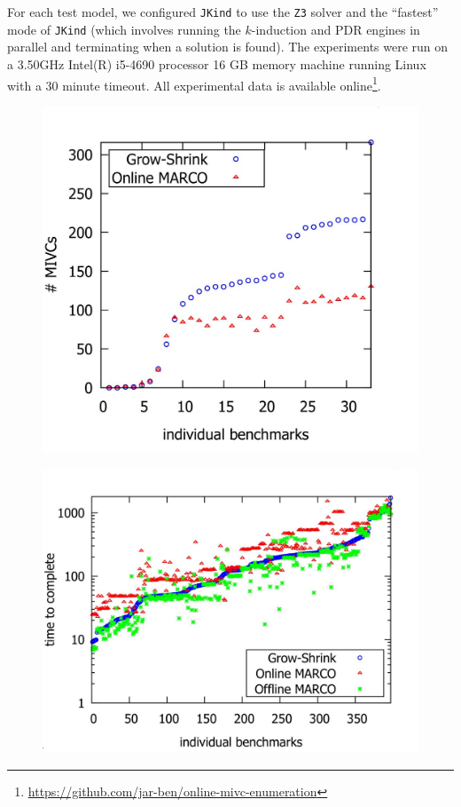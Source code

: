 For each test model, we configured \texttt{JKind} to use the \texttt{Z3} solver and the ``fastest'' mode of \texttt{JKind} (which involves running the $k$-induction and PDR engines in parallel and terminating when a solution is found). The experiments were run on a  3.50GHz  Intel(R) i5-4690 processor 16 GB memory machine running Linux with a 30 minute timeout.  All experimental data is available online\footnote{\url{https://github.com/jar-ben/online-mivc-enumeration}}.




\begin{figure}
\centering
\begin{minipage}{\textwidth}
\centering
\includegraphics[scale=0.5]{./figs/found_mivcs.png}%
%
\label{res:found_mivcs}
\end{minipage}\hfill
\begin{minipage}{\textwidth}
\centering
\includegraphics[scale=0.5]{./figs/time_to_complete.png}%
%
\label{res:time_to_complete}
\end{minipage}
\end{figure}
